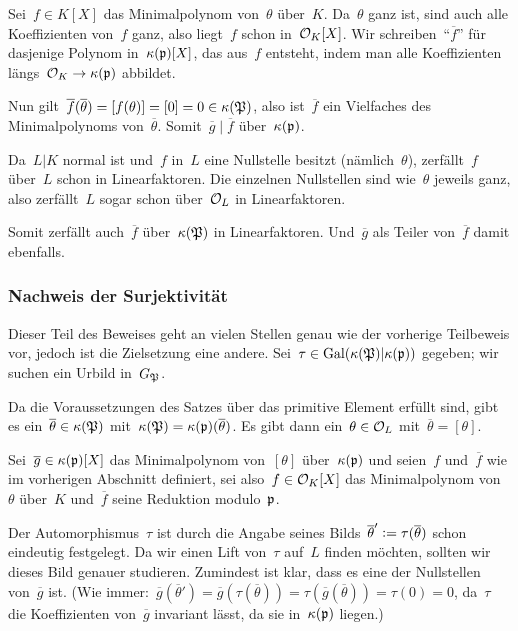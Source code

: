 \documentclass[8pt]{uebblatt}
\newcommand{\ov}[1]{\overline{#1}}
\begin{document}
Sei~$f \in K[X]$ das Minimalpolynom von~$\theta$ über~$K$. Da~$\theta$ ganz
ist, sind auch alle Koeffizienten von~$f$ ganz, also liegt~$f$ schon
in~$\mathcal{O}_K[X]$. Wir schreiben~"`$\ov f$"' für dasjenige Polynom
in~$\kappa(\mathfrak{p})[X]$, das aus~$f$ entsteht, indem man alle Koeffizienten
längs~$\mathcal{O}_K \to \kappa(\mathfrak{p})$ abbildet.

Nun gilt~$\ov f(\ov\theta) = [f(\theta)] = [0] = 0 \in \kappa(\PPP)$, also
ist~$\ov f$ ein Vielfaches des Minimalpolynoms von~$\ov\theta$. Somit~$\ov g
\mid \ov f$ über~$\kappa(\mathfrak{p})$.

Da~$L|K$ normal ist und~$f$ in~$L$ eine Nullstelle besitzt (nämlich~$\theta$),
zerfällt~$f$ über~$L$ schon in Linearfaktoren. Die einzelnen Nullstellen sind
wie~$\theta$ jeweils ganz, also zerfällt~$L$ sogar schon über~$\mathcal{O}_L$ in
Linearfaktoren.

Somit zerfällt auch~$\ov f$ über~$\kappa(\mathfrak{P})$ in Linearfaktoren. Und~$\ov g$
als Teiler von~$\ov f$ damit ebenfalls.


\subsubsection*{Nachweis der Surjektivität}

Dieser Teil des Beweises geht an vielen Stellen genau wie der vorherige
Teilbeweis vor, jedoch ist die Zielsetzung eine andere. Sei~$\tau \in
\mathrm{Gal}(\kappa(\mathfrak{P})|\kappa(\mathfrak{p}))$ gegeben; wir suchen ein Urbild
in~$G_{\mathfrak{P}}$.

Da die Voraussetzungen des Satzes über das primitive Element erfüllt sind, gibt
es ein~$\ov\theta \in \kappa(\PPP)$ mit~$\kappa(\PPP) = \kappa(\ppp)(\ov\theta)$.
Es gibt dann ein~$\theta \in \mathcal{O}_L$ mit~$\ov\theta = [\theta]$.

Sei~$\ov g \in \kappa(\ppp)[X]$ das Minimalpolynom von~$[\theta]$
über~$\kappa(\mathfrak{p})$ und seien~$f$ und~$\ov f$ wie im vorherigen Abschnitt
definiert, sei also~$f \in \mathcal{O}_K[X]$ das Minimalpolynom von~$\theta$ über~$K$
und~$\ov f$ seine Reduktion modulo~$\mathfrak{p}$.

Der Automorphismus~$\tau$ ist durch die Angabe seines Bilds~$\ov\theta' \defeq
\tau(\ov\theta)$ schon eindeutig festgelegt. Da wir einen Lift von~$\tau$
auf~$L$ finden möchten, sollten wir dieses Bild genauer studieren. Zumindest
ist klar, dass es eine der Nullstellen von~$\ov g$ ist. (Wie immer:~$\ov
g(\ov\theta') = \ov g(\tau(\ov\theta)) = \tau(\ov g(\ov\theta)) = \tau(0) =
0$, da~$\tau$ die Koeffizienten von~$\ov g$ invariant lässt, da sie
in~$\kappa(\mathfrak{p})$ liegen.)
\end{document}
